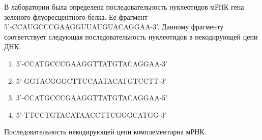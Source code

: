 
В лаборатории была определена последовательность нуклеотидов мРНК гена
зеленого флуоресцентного белка. Ее фрагмент\\ 5'-CCAUGCCCGAAGGUUAUGUACAGGAA-3'.
Данному фрагменту соответствует следующая последовательность нуклеотидов в
некодирующей цепи ДНК.

\begin{enumerate}
    \item 5'-CCATGCCCGAAGGTTATGTACAGGAA-3'
    \item 5'-GGTACGGGCTTCCAATACATGTCCTT-3'
    \item 3’-CCATGCCCGAAGGTTATGTACAGGAA-5’
    \item 5’-TTCCTGTACATAACCTTCGGGCATGG-3’
\end{enumerate}


\explanationSection

Последовательность некодирующей цепи комплементарна мРНК.

